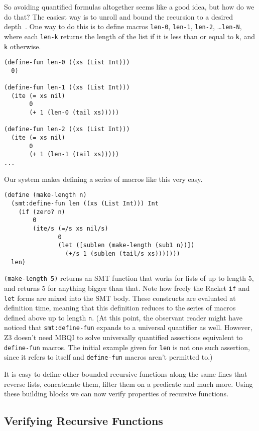 So avoiding quantified formulas altogether seems like a good idea, but how do
we do that? The easiest way is to unroll and bound the recursion to a desired
depth~\cite{sat-recursive}. One way to do this is to define macros
\texttt{len-0}, \texttt{len-1}, \texttt{len-2}, \ldots \texttt{len-N}, where
each \texttt{len-k} returns the length of the list if it is less than or equal
to \texttt{k}, and \texttt{k} otherwise.

\begin{verbatim}
(define-fun len-0 ((xs (List Int)))
  0)

(define-fun len-1 ((xs (List Int)))
  (ite (= xs nil)
       0
       (+ 1 (len-0 (tail xs)))))

(define-fun len-2 ((xs (List Int)))
  (ite (= xs nil)
       0
       (+ 1 (len-1 (tail xs)))))
...
\end{verbatim}

Our system makes defining a series of macros like this very easy.

\begin{verbatim}
(define (make-length n)
  (smt:define-fun len ((xs (List Int))) Int
    (if (zero? n)
        0
        (ite/s (=/s xs nil/s)
               0
               (let ([sublen (make-length (sub1 n))])
                 (+/s 1 (sublen (tail/s xs)))))))
  len)
\end{verbatim}

\texttt{(make-length 5)} returns an SMT function that works for lists of up to
length 5, and returns 5 for anything bigger than that. Note how freely the
Racket \texttt{if} and \texttt{let} forms are mixed into the SMT body. These
constructs are evaluated at definition time, meaning that this definition
reduces to the series of macros defined above up to length \texttt{n}. (At
this point, the observant reader might have noticed that
\texttt{smt:define-fun} expands to a universal quantifier as well. However, Z3
doesn't need MBQI to solve universally quantified assertions equivalent to
\texttt{define-fun} macros. The initial example given for \texttt{len} is not
one such assertion, since it refers to itself and \texttt{define-fun} macros
aren't permitted to.)

It is easy to define other bounded recursive functions along the same lines
that reverse lists, concatenate them, filter them on a predicate and much
more. Using these building blocks we can now verify properties of recursive
functions.

\subsection{Verifying Recursive Functions}

